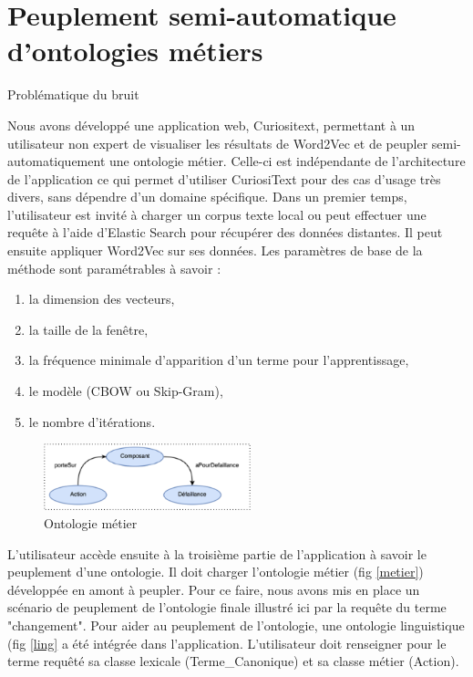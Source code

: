 \section{Peuplement semi-automatique d'ontologies métiers}

Problématique du bruit

Nous avons développé une application web, Curiositext, permettant à un utilisateur non expert de visualiser les résultats de Word2Vec et de peupler semi-automatiquement une ontologie métier. Celle-ci est indépendante de l'architecture de l'application ce qui permet d'utiliser CuriosiText pour des cas d'usage très divers, sans dépendre d'un domaine spécifique. Dans un premier temps, l'utilisateur est invité à charger un corpus texte local ou peut effectuer une requête à l'aide d'Elastic Search pour récupérer des données distantes. Il peut ensuite appliquer Word2Vec sur ses données. Les paramètres de base de la méthode sont paramétrables à savoir :

\begin{enumerate}
\item	la dimension des vecteurs,
\item	la taille de la fenêtre,
\item		la fréquence minimale d'apparition d’un terme pour l’apprentissage,
\item	le modèle (CBOW ou Skip-Gram),
\item	le nombre d’itérations.
\end{enumerate}

\begin{figure}[tb]
    \begin{center}
        \includegraphics[width=6cm]{figures/ontMetier}
    \end{center}
    \caption{Ontologie métier}\label{fig:metier}
\end{figure}

L'utilisateur accède ensuite à la troisième partie de l'application à savoir le peuplement d'une ontologie. Il doit charger l’ontologie métier (fig \ref{metier}) développée en amont à peupler. Pour ce faire, nous avons mis en place un scénario de peuplement de l'ontologie finale illustré ici par la requête du terme "changement".
Pour aider au peuplement de l'ontologie, une ontologie linguistique (fig \ref{ling} a été intégrée dans l'application. L'utilisateur doit renseigner pour le terme requêté sa classe lexicale (Terme\_Canonique) et sa classe métier (Action).

